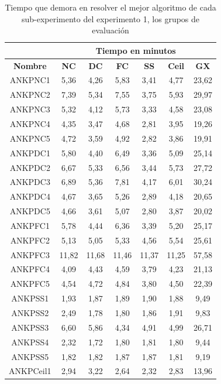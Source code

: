 \begin{table}[hbtp!]
\caption{Tiempo que demora en resolver el mejor algoritmo de cada sub-experimento del experimento 1, los grupos de evaluación}\label{tab:evol_vs_eval_tiempos_exp1}
\small
\centering
\begin{center}
\begin{tabular}{c|cccccc}
{\textbf{}} & \multicolumn{6}{c}{{\textbf{Tiempo en minutos}}} \\ \hline
{\textbf{Nombre}} & {\textbf{NC}} & {\textbf{DC}} & {\textbf{FC}} & {\textbf{SS}} & {\textbf{Ceil}} & {\textbf{GX}} \\ \hline
ANKPNC1 & 5,36 & 4,26 & 5,83 & 3,41 & 4,77 & 23,62 \\
ANKPNC2 & 7,39 & 5,34 & 7,55 & 3,75 & 5,93 & 29,97 \\
ANKPNC3 & 5,32 & 4,12 & 5,73 & 3,33 & 4,58 & 23,08 \\
ANKPNC4 & 4,35 & 3,47 & 4,68 & 2,81 & 3,95 & 19,26 \\
ANKPNC5 & 4,72 & 3,59 & 4,92 & 2,82 & 3,86 & 19,91 \\
ANKPDC1 & 5,80 & 4,40 & 6,49 & 3,36 & 5,09 & 25,14 \\
ANKPDC2 & 6,67 & 5,33 & 6,56 & 3,44 & 5,73 & 27,72 \\
ANKPDC3 & 6,89 & 5,36 & 7,81 & 4,17 & 6,01 & 30,24 \\
ANKPDC4 & 4,67 & 3,65 & 5,26 & 2,89 & 4,18 & 20,65 \\
ANKPDC5 & 4,66 & 3,61 & 5,07 & 2,80 & 3,87 & 20,02 \\
ANKPFC1 & 5,78 & 4,44 & 6,36 & 3,39 & 5,20 & 25,17 \\
ANKPFC2 & 5,13 & 5,05 & 5,33 & 4,56 & 5,54 & 25,61 \\
ANKPFC3 & 11,82 & 11,68 & 11,46 & 11,37 & 11,25 & 57,58 \\
ANKPFC4 & 4,09 & 4,43 & 4,59 & 3,79 & 4,23 & 21,13 \\
ANKPFC5 & 4,54 & 4,72 & 4,84 & 3,80 & 4,50 & 22,39 \\
ANKPSS1 & 1,93 & 1,87 & 1,89 & 1,90 & 1,88 & 9,49 \\
ANKPSS2 & 2,49 & 1,78 & 1,80 & 1,86 & 1,91 & 9,83 \\
ANKPSS3 & 6,60 & 5,86 & 4,34 & 4,91 & 4,99 & 26,71 \\
ANKPSS4 & 2,32 & 1,72 & 1,80 & 1,81 & 1,80 & 9,44 \\
ANKPSS5 & 1,82 & 1,82 & 1,87 & 1,87 & 1,81 & 9,19 \\
ANKPCeil1 & 2,94 & 3,22 & 2,64 & 2,32 & 2,83 & 13,96 \\

\end{tabular}
\end{center}
\end{table}

